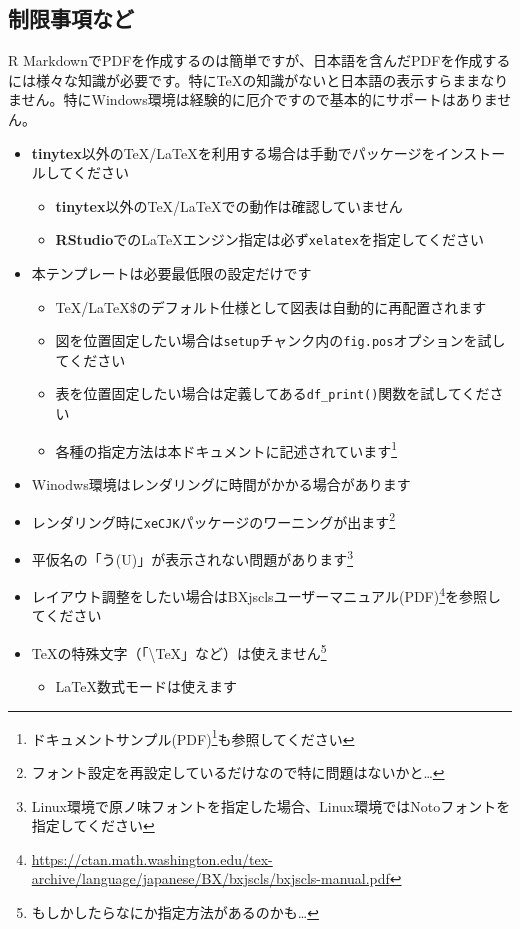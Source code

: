 \documentclass[
  12pt,
  a4paper,
  xelatex,
  ja=standard]{bxjsarticle}
\DeclareRobustCommand{\href}[2]{#2\footnote{\url{#1}}}
\providecommand{\tightlist}{%
  \setlength{\itemsep}{0pt}\setlength{\parskip}{0pt}}
\begin{document}
\hypertarget{ux5236ux9650ux4e8bux9805ux306aux3069}{%
\subsection{制限事項など}\label{ux5236ux9650ux4e8bux9805ux306aux3069}}

R
MarkdownでPDFを作成するのは簡単ですが、日本語を含んだPDFを作成するには様々な知識が必要です。特にTeXの知識がないと日本語の表示すらままなりません。特にWindows環境は経験的に厄介ですので基本的にサポートはありません。

\begin{itemize}
\item
  \textbf{tinytex}以外のTeX/LaTeXを利用する場合は手動でパッケージをインストールしてください

  \begin{itemize}
  \tightlist
  \item
    \textbf{tinytex}以外のTeX/LaTeXでの動作は確認していません
  \item
    \textbf{RStudio}でのLaTeXエンジン指定は必ず\texttt{xelatex}を指定してください
  \end{itemize}
\item
  本テンプレートは必要最低限の設定だけです

  \begin{itemize}
  \tightlist
  \item
    TeX/LaTeX\$のデフォルト仕様として図表は自動的に再配置されます
  \item
    図を位置固定したい場合は\texttt{setup}チャンク内の\texttt{fig.pos}オプションを試してください
  \item
    表を位置固定したい場合は定義してある\texttt{df\_print()}関数を試してください
  \item
    各種の指定方法は本ドキュメントに記述されています\footnote{\href{https://ftp.jaist.ac.jp/pub/CTAN/macros/latex/contrib/tufte-latex/sample-handout.pdf}{ドキュメントサンプル(PDF)}も参照してください}
  \end{itemize}
\item
  Winodws環境はレンダリングに時間がかかる場合があります
\item
  レンダリング時に\texttt{xeCJK}パッケージのワーニングが出ます\footnote{フォント設定を再設定しているだけなので特に問題はないかと\ldots{}}
\item
  平仮名の「う(U)」が表示されない問題があります\footnote{Linux環境で原ノ味フォントを指定した場合、Linux環境ではNotoフォントを指定してください}
\item
  レイアウト調整をしたい場合は\href{https://ctan.math.washington.edu/tex-archive/language/japanese/BX/bxjscls/bxjscls-manual.pdf}{BXjsclsユーザーマニュアル(PDF)}を参照してください
\item
  TeXの特殊文字（「\textbackslash TeX」など）は使えません\footnote{もしかしたらなにか指定方法があるのかも\ldots{}}

  \begin{itemize}
  \tightlist
  \item
    LaTeX数式モードは使えます
  \end{itemize}
\end{itemize}
\end{document}
